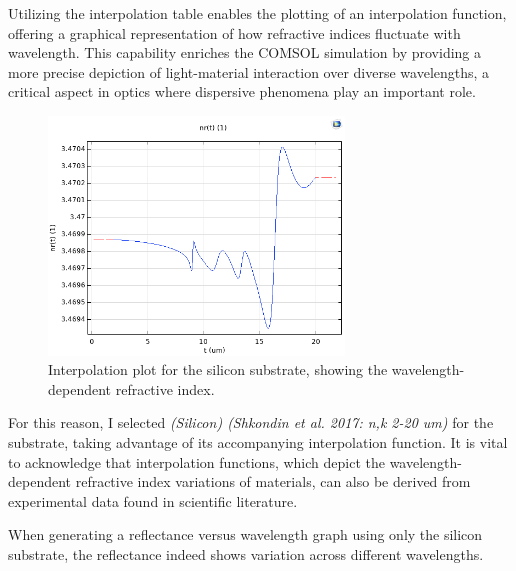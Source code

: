 Utilizing the interpolation table enables the plotting of an interpolation function, offering a graphical representation of how refractive indices fluctuate with wavelength. This capability enriches the COMSOL simulation by providing a more precise depiction of light-material interaction over diverse wavelengths, a critical aspect in optics where dispersive phenomena play an important role.

\begin{figure}[H]
  \centering
  \includegraphics[width=0.7\textwidth]{Chapters/Figures/Chapter 4 Figures/Interpolation Plot (Silicon Substrate).png}
  \caption{Interpolation plot for the silicon substrate, showing the wavelength-dependent refractive index.}
  \label{fig:interpolation-plot-silicon}
\end{figure}

For this reason, I selected \emph{(Silicon) (Shkondin et al. 2017: n,k 2-20 um)} for the substrate, taking advantage of its accompanying interpolation function. It is vital to acknowledge that interpolation functions, which depict the wavelength-dependent refractive index variations of materials, can also be derived from experimental data found in scientific literature.

When generating a reflectance versus wavelength graph using only the silicon substrate, the reflectance indeed shows variation across different wavelengths.

